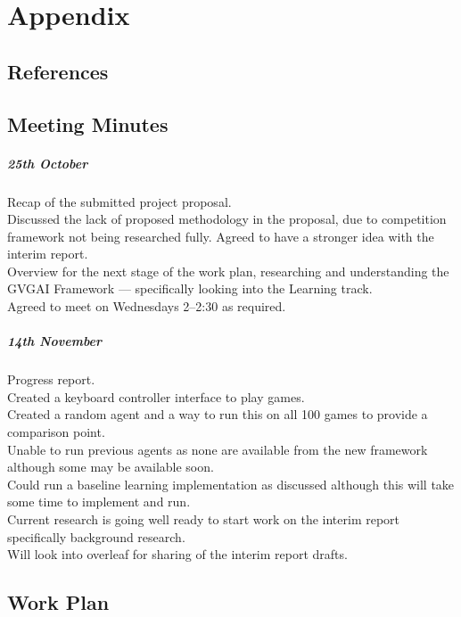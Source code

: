 \documentclass[a4paper]{article}
\begin{document}
\pagebreak
\section{Appendix}
\subsection{References}
\renewcommand\refname{\vspace{-1cm}}



\subsection{Meeting Minutes}
\subparagraph{25th October}
Recap of the submitted project proposal. \\
Discussed the lack of proposed methodology in the proposal, due to competition framework not being researched fully. Agreed to have a stronger idea with the interim report. \\
Overview for the next stage of the work plan, researching and understanding the GVGAI Framework --- specifically looking into the Learning track. \\
Agreed to meet on Wednesdays 2--2:30 as required.

\subparagraph{14th November}
Progress report. \\
Created a keyboard controller interface to play games. \\
Created a random agent and a way to run this on all 100 games to provide a comparison point. \\
Unable to run previous agents as none are available from the new framework although some may be available soon. \\
Could run a baseline learning implementation as discussed although this will take some time to implement and run. \\
Current research is going well ready to start work on the interim report specifically background research. \\
Will look into overleaf for sharing of the interim report drafts.

\subsection{Work Plan}
\end{document}
